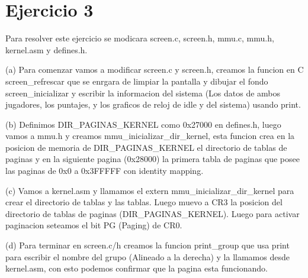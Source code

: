 \section{Ejercicio 3}

Para resolver este ejercicio se modicara screen.c, screen.h, mmu.c, mmu.h, kernel.asm y defines.h.

(a)
Para comenzar vamos a modificar screen.c y screen.h, creamos la funcion en C screen_refrescar que se enrgara de limpiar la pantalla y dibujar el fondo screen_inicializar y escribir la informacion del sistema (Los datos de ambos jugadores, los puntajes, y los graficos de reloj de idle y del sistema) usando print.

(b)
Definimos DIR_PAGINAS_KERNEL como 0x27000 en defines.h, luego vamos a mmu.h y creamos mmu_inicializar_dir_kernel, esta funcion crea en la posicion de memoria de DIR_PAGINAS_KERNEL el directorio de tablas de paginas y en la siguiente pagina (0x28000) la primera tabla de paginas que posee las paginas de 0x0 a 0x3FFFFF con identity mapping.

(c)
Vamos a kernel.asm y llamamos el extern mmu_inicializar_dir_kernel para crear el directorio de tablas y las tablas. Luego muevo a CR3 la posicion del directorio de tablas de paginas (DIR_PAGINAS_KERNEL). Luego para activar paginacion seteamos el bit PG (Paging) de CR0.

(d)
Para terminar en screen.c/h creamos la funcion print_group que usa print para escribir el nombre del grupo (Alineado a la derecha) y la llamamos desde kernel.asm, con esto podemos confirmar que la pagina esta funcionando.